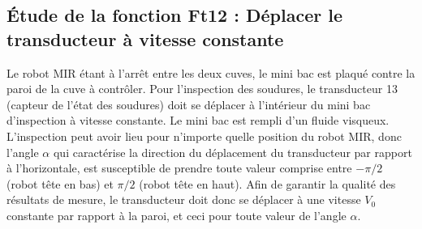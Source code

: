 \documentclass[10pt,fleqn]{article} %
\begin{document}
\begin{multicols}{2}
%
%
%
%
%
%
%

\subsection*{Étude de la fonction Ft12 : Déplacer le transducteur à vitesse constante}

Le robot MIR étant à l’arrêt entre les deux cuves, le mini bac est plaqué contre la paroi de la cuve à contrôler. Pour l’inspection des soudures, le transducteur 13 (capteur de l’état des soudures) doit se déplacer à l’intérieur du mini bac d’inspection à vitesse constante. Le mini bac est rempli d’un fluide visqueux. L’inspection peut avoir lieu pour n’importe quelle position du robot MIR, donc l’angle $\alpha$ qui caractérise la direction du déplacement du transducteur par rapport à l’horizontale, est susceptible de prendre toute valeur comprise entre $-\pi/2$ (robot tête en bas) et $\pi/2$ (robot tête en haut). Afin de garantir la qualité des résultats de mesure, le transducteur doit donc se déplacer à une vitesse $V_0$ constante par rapport à la paroi, et ceci pour toute valeur de l’angle $\alpha$.


\end{multicols}
\end{document}
